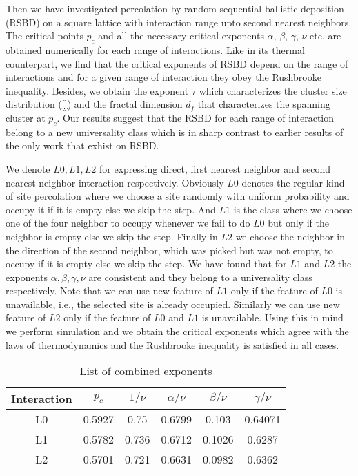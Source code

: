  Then we have investigated percolation by random sequential ballistic deposition (RSBD) on a square lattice with interaction range upto second nearest neighbors. The critical points $p_c$ and all the necessary critical exponents $\alpha$, $\beta$, $\gamma$, $\nu$ etc. are obtained numerically for each range of interactions. Like  in its thermal counterpart, we find that the critical exponents of RSBD depend on the range of interactions and for a given range of interaction they obey the Rushbrooke inequality. Besides, we obtain the exponent $\tau$ which characterizes the cluster size distribution (\ref{}) and the fractal dimension $d_f$ that characterizes the spanning cluster at $p_c$. Our results suggest that the RSBD for each range of interaction belong to a new universality class which is in sharp contrast to earlier results of the only work that exhist on RSBD.
 

We denote $L0,L1,L2$ for expressing direct, first nearest neighbor and second nearest neighbor interaction respectively. Obviously $L0$ denotes the regular kind of site percolation where we choose a site randomly with uniform probability and occupy it if it is empty else we skip the step. And $L1$ is the class where we choose one of the four neighbor to occupy whenever we fail to do $L0$ but only if the neighbor is empty else we skip the step. Finally in $L2$ we choose the neighbor in the direction of the second neighbor, which was picked but was not empty, to occupy if it is empty else we skip the step. We have found that for $L1$ and $L2$ the exponents $\alpha, \beta, \gamma, \nu$ are consistent and they belong to a universality class respectively. 
Note that  we can use new feature of $L1$ only if the feature of $L0$ is unavailable, i.e., the selected site is already occupied. Similarly we can use new feature of $L2$ only if the feature of $L0$ and $L1$ is unavailable. Using this in mind we perform simulation and we obtain the critical exponents which agree with the laws of thermodynamics and the Rushbrooke inequality is satisfied in all cases.\\

\begin{table}
\centering
\begin{tabular}{|c|c|c|c|c|c|}
	\hline
	Interaction & $p_c$ & $1/\nu$ & $\alpha/\nu$ & $\beta/\nu$ & $\gamma/\nu$ \\ \hline
	L0 & 0.5927 & 0.75  & 0.6799 & 0.103  & 0.64071  \\ \hline
	L1 & 0.5782 & 0.736 & 0.6712 & 0.1026 & 0.6287  \\ \hline
	L2 & 0.5701 & 0.721 & 0.6631 & 0.0982 & 0.6362  \\ \hline
\end{tabular}
\caption{List of combined exponents}
\label{tab:exponents-combined}
\end{table}

